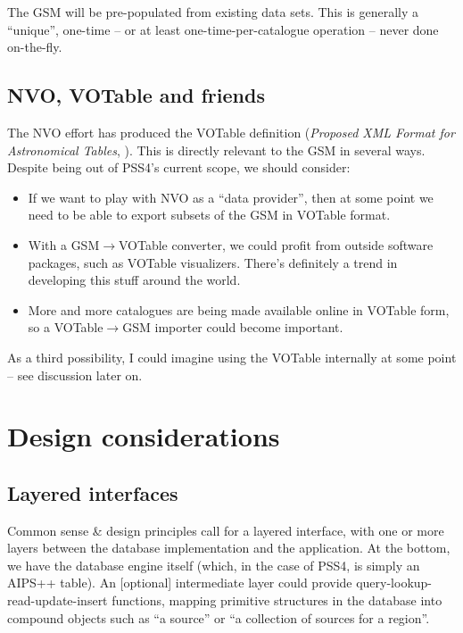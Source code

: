 \documentclass[10pt]{article}
\begin{document}
The GSM will be pre-populated from existing data sets. This is generally a
``unique'', one-time -- or at least one-time-per-catalogue operation -- never
done on-the-fly.

  \subsection{NVO, VOTable and friends}

The NVO effort has produced the VOTable definition ({\em Proposed XML Format
for Astronomical Tables}, \cite{VOT}). This is directly relevant to the GSM in
several ways. Despite being out of PSS4's current scope, we should consider:

\begin{itemize}

\item If we want to play with NVO as a ``data provider'', then at some point we
need to be able to export subsets of the GSM in VOTable format. 

\item With a GSM$\rightarrow$VOTable converter, we could profit from outside
software packages, such as VOTable visualizers. There's definitely a trend in
developing this stuff around the world.

\item More and more catalogues are being made available online in VOTable form,
so a VOTable$\rightarrow$GSM importer could become important.

\end{itemize}

As a third possibility, I could imagine using the VOTable internally at some
point -- see discussion later on.

\section{Design considerations}

\subsection{Layered interfaces}

Common sense \& design principles call for a layered interface, with one or
more layers between the database implementation  and the application. At the
bottom, we have the database engine itself (which, in the case of PSS4, is
simply an AIPS++ table). An [optional] intermediate layer could provide
query-lookup-read-update-insert functions, mapping primitive structures in the
database into compound objects such as ``a source'' or ``a collection of sources
for a region''. 
\end{document}
